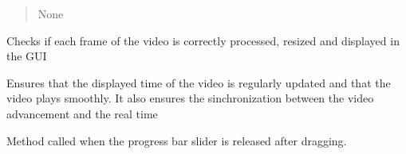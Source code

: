 \documentclass[letterpaper,10pt,english]{sphinxmanual}
\begin{document}
\begin{fulllineitems}
\begin{fulllineitems}
\begin{quote}
\begin{description}
\sphinxAtStartPar
None

\sphinxAtStartPar
{} \textendash{} 

\end{description}\end{quote}

\end{fulllineitems}


\begin{fulllineitems}
\label{\detokenize{general_interface:general_interface.LecteurVideo.mettre_a_jour_frame_video}}
\pysigstartsignatures
{}
\pysigstopsignatures
\sphinxAtStartPar
Checks if each frame of the video is correctly processed, resized and displayed in the GUI

\end{fulllineitems}


\begin{fulllineitems}
\label{\detokenize{general_interface:general_interface.LecteurVideo.mettre_a_jour_temps_video}}
\pysigstartsignatures
{}
\pysigstopsignatures
\sphinxAtStartPar
Ensures that the displayed time of the video is regularly updated and that the video plays smoothly.
It also ensures the sinchronization between the video advancement and the real time

\end{fulllineitems}


\begin{fulllineitems}
\label{\detokenize{general_interface:general_interface.LecteurVideo.on_drag_end}}
\pysigstartsignatures
{}
\pysigstopsignatures
\sphinxAtStartPar
Method called when the progress bar slider is released after dragging.


\end{fulllineitems}
\end{fulllineitems}
\end{document}
